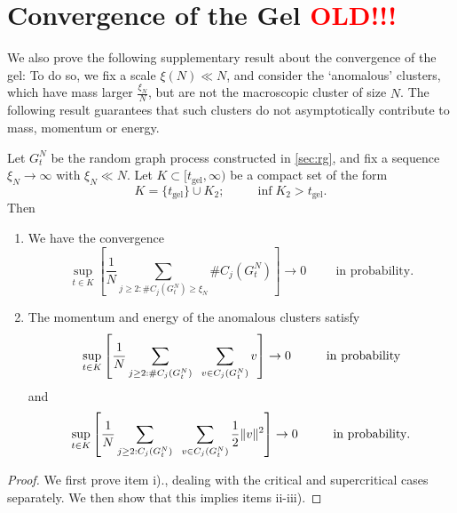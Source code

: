\section{Convergence of the Gel \textbf{\textcolor{red}{OLD!!!}}}
We also prove the following supplementary result about the convergence of the gel:
  To do so, we fix a scale $\xi(N)\ll N$, and consider the `anomalous' clusters, which have mass larger $\frac{\xi_N}{N}$, but are not the macroscopic cluster of size $N$. The following result guarantees that such clusters do not asymptotically contribute to mass, momentum or energy. \begin{lemma}\label{lemma: anomalous clusters} Let $G^N_t$ be the random graph process constructed in \ref{sec:rg}, and fix a sequence $\xi_N\rightarrow \infty$ with $\xi_N\ll N$. Let $K\subset [t_\text{gel}, \infty)$ be a compact set of the form \begin{equation}\label{eq: form of K}
    K=\{t_\text{gel}\}\cup K_2; \hspace{1cm} \inf K_2 >t_\text{gel}.
\end{equation}  Then \begin{enumerate}
[label=\roman{*}).]
    \item We have the convergence \begin{equation}
       \sup_{t\in K}\left[\frac{1}{N}\sum_{j\geq 2: \#C_j(G^N_t)\geq \xi_N} \#C_j(G^N_t)\right] \rightarrow 0 \hspace{1cm}\text{in probability.}\end{equation}
        \item The momentum and energy of the anomalous clusters satisfy
        \begin{equation}
            \sup_{t\in K}\left[\frac{1}{N}\sum_{j\geq 2: \#C_j(G^N_t)}\hspace{0.2cm} \sum_{v\in C_j(G^N_t)}v\right] \rightarrow 0  \hspace{1cm} 
    \text{in probability}
        \end{equation} and  \begin{equation}
            \sup_{t\in K}\left[\frac{1}{N}\sum_{j\geq 2: C_j(G^N_t)}\hspace{0.2cm} \sum_{v\in C_j(G^N_t)}\frac{1}{2}\|v\|^2\right] \rightarrow 0  \hspace{1cm} 
    \text{in probability}.
        \end{equation}
\end{enumerate} \end{lemma}  \begin{proof} We first prove item i)., dealing with the critical and supercritical cases separately. We then show that this implies items ii-iii).

\end{proof}
